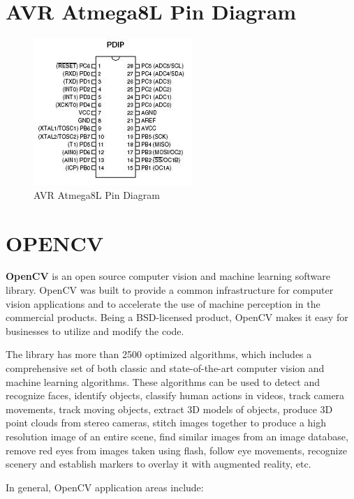 \documentclass[12pt, a4paper]{article}
\begin{document}
\section{AVR Atmega8L Pin Diagram}
\begin{figure}[htp]
\centering
\includegraphics[scale=1.00]{avr.jpeg}
\caption{AVR Atmega8L Pin Diagram}
\label{}
\end{figure}
\newpage
\section{OPENCV}
\textbf{\ac{OpenCV}} is an open source computer vision and machine learning software library. \ac{OpenCV} was built to provide a common infrastructure for computer vision applications and to accelerate the use of machine perception in the commercial products. Being a BSD-licensed product, \ac{OpenCV} makes it easy for businesses to utilize and modify the code.

The library has more than 2500 optimized algorithms, which includes a comprehensive set of both classic and state-of-the-art computer vision and machine learning algorithms. These algorithms can be used to detect and recognize faces, identify objects, classify human actions in videos, track camera movements, track moving objects, extract \ac{3D} models of objects, produce \ac{3D} point clouds from stereo cameras, stitch images together to produce a high resolution image of an entire scene, find similar images from an image database, remove red eyes from images taken using flash, follow eye movements, recognize scenery and establish markers to overlay it with augmented reality, etc.

In general, \ac{OpenCV} application areas include:
\end{document}

